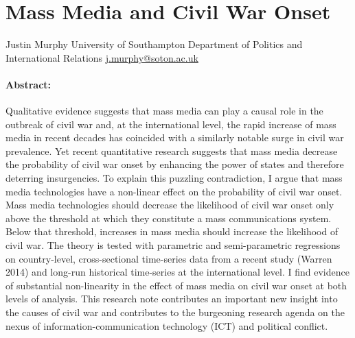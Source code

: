 \documentclass[11pt,article,oneside]{memoir}
\author{}
\date{}
\begin{document}
  
\setsansfont[Mapping=tex-text]{Gill Sans} 
\setmonofont[Mapping=tex-text,Scale=0.8]{Consolas}
\pagestyle{kjh}

\singlespacing





\thispagestyle{empty}

\section{Mass Media and Civil War
Onset}\label{mass-media-and-civil-war-onset}

Justin Murphy \newline
University of Southampton \newline     
Department of Politics and International Relations \newline     
\href{mailto:j.murphy@soton.ac.uk}{j.murphy@soton.ac.uk} \newline    

\paragraph{Abstract:}\label{abstract}

Qualitative evidence suggests that mass media can play a causal role in
the outbreak of civil war and, at the international level, the rapid
increase of mass media in recent decades has coincided with a similarly
notable surge in civil war prevalence. Yet recent quantitative research
suggests that mass media decrease the probability of civil war onset by
enhancing the power of states and therefore deterring insurgencies. To
explain this puzzling contradiction, I argue that mass media
technologies have a non-linear effect on the probability of civil war
onset. Mass media technologies should decrease the likelihood of civil
war onset only above the threshold at which they constitute a mass
communications system. Below that threshold, increases in mass media
should increase the likelihood of civil war. The theory is tested with
parametric and semi-parametric regressions on country-level,
cross-sectional time-series data from a recent study (Warren 2014) and
long-run historical time-series at the international level. I find
evidence of substantial non-linearity in the effect of mass media on
civil war onset at both levels of analysis. This research note
contributes an important new insight into the causes of civil war and
contributes to the burgeoning research agenda on the nexus of
information-communication technology (ICT) and political
conflict.\newline
\end{document}
